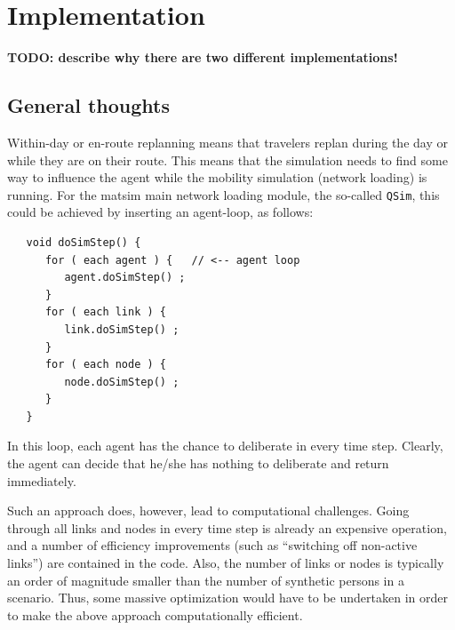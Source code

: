 \section{Implementation}
\textbf{TODO: describe why there are two different implementations!}

\subsection{General thoughts}

Within-day or en-route replanning means that travelers replan during the day or while they are on their route.  This means that the simulation needs to find some way to influence the agent while the mobility simulation (network loading) is running.  For the \acrshort{matsim} main network loading module, the so-called \verb$QSim$, this could be achieved by inserting an agent-loop, as follows:
\begin{lstlisting}
   void doSimStep() {
      for ( each agent ) {   // <-- agent loop
         agent.doSimStep() ;
      }
      for ( each link ) {
         link.doSimStep() ;
      }
      for ( each node ) {
         node.doSimStep() ;
      }
   }  
\end{lstlisting}
In this loop, each agent has the chance to deliberate in every time step.  Clearly, the agent can decide that he/she has nothing to deliberate and return immediately.

Such an approach does, however, lead to computational challenges.  Going through all links and nodes in every time step is already an expensive operation, and a number of efficiency improvements (such as ``switching off non-active links'') are contained in the code.  Also, the number of links or nodes is typically an order of magnitude smaller than the number of synthetic persons in a scenario.  Thus, some massive optimization would have to be undertaken in order to make the above approach computationally efficient.

